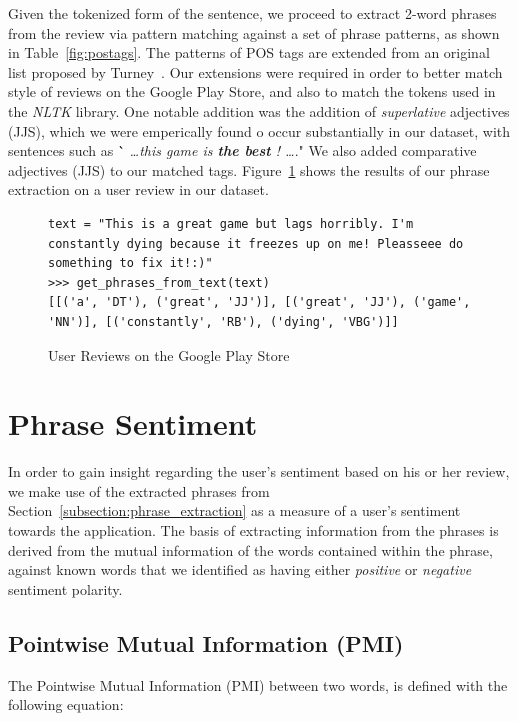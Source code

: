 \documentclass[11pt]{report} %
\begin{document}
Given the tokenized form of the sentence, we proceed to extract 2-word phrases from the review via pattern matching against a set of phrase patterns, as shown in Table~\ref{fig:postags}. The patterns of POS tags are extended from an original list proposed by Turney~\cite{Turney2001}. Our extensions were required in order to better match style of reviews on the Google Play Store, and also to match the tokens used in the \textit{NLTK} library. One notable addition was the addition of \textit{superlative} adjectives (JJS), which we were emperically found o occur substantially in our dataset, with sentences such as \`` \textit{\dots this game is \textbf{the best} ! \dots}." We also added comparative adjectives (JJS) to our matched tags. Figure~\ref{fig:phrase_extraction} shows the results of our phrase extraction on a user review in our dataset.

\begin{figure}[h!]
  \centering
\begin{lstlisting}
text = "This is a great game but lags horribly. I'm constantly dying because it freezes up on me! Pleasseee do something to fix it!:)"
>>> get_phrases_from_text(text)
[[('a', 'DT'), ('great', 'JJ')], [('great', 'JJ'), ('game', 'NN')], [('constantly', 'RB'), ('dying', 'VBG')]]

\end{lstlisting}
 \caption{User Reviews on the Google Play Store}
\label{fig:phrase_extraction}
\end{figure}

\section{Phrase Sentiment}
\label{section:phrase_sentiment}
In order to gain insight regarding the user's sentiment based on his or her review, we make use of the extracted phrases from 
Section~\ref{subsection:phrase_extraction} as a measure of a user's sentiment towards the application. The basis of extracting information from the phrases is derived from the mutual information of the words contained within the phrase, against known words that we identified as having either \textit{positive} or \textit{negative} sentiment polarity. 

\subsection{Pointwise Mutual Information (PMI)}
The Pointwise Mutual Information (PMI) between two words\cite{church1990}, is defined with the following equation:
\end{document}

